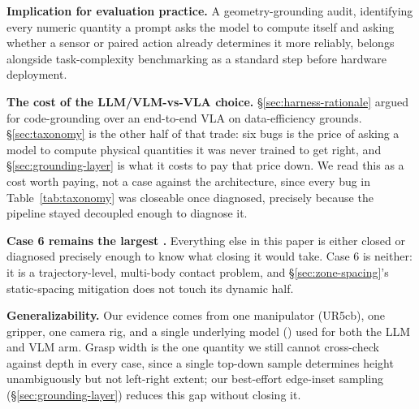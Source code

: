 \textbf{Implication for evaluation practice.}  A
geometry-grounding audit, identifying every numeric quantity a prompt
asks the model to compute
itself and asking whether a sensor or paired action already determines
it more reliably, belongs alongside task-complexity benchmarking as a
standard step before hardware deployment.

\textbf{The cost of the LLM/VLM-vs-VLA choice.} \S\ref{sec:harness-rationale}
argued for code-grounding over an end-to-end VLA on data-efficiency
grounds. \S\ref{sec:taxonomy} is the other half of that trade: six bugs
is the price of asking a model to compute physical quantities it was
never trained to get right, and \S\ref{sec:grounding-layer} is what it
costs to pay that price down. We read this as a cost worth paying, not a
case against the architecture, since every bug in Table~\ref{tab:taxonomy}
was closeable once diagnosed, precisely because the pipeline stayed
decoupled enough to diagnose it.

\textbf{Case 6 remains the largest .} Everything else in this
paper is either closed or diagnosed precisely enough to know what
closing it would take. Case 6 is neither: it is a trajectory-level,
multi-body contact problem, and \S\ref{sec:zone-spacing}'s
static-spacing mitigation does not touch its dynamic half. 

\textbf{Generalizability.} Our evidence comes from one manipulator
(UR5cb), one gripper, one camera rig, and a single underlying model
() used for both the LLM and VLM arm.  Grasp width is the one quantity we still cannot cross-check
against depth in every case, since a single top-down sample determines
height unambiguously but not left-right extent; our best-effort
edge-inset sampling (\S\ref{sec:grounding-layer}) reduces this gap
without closing it.

